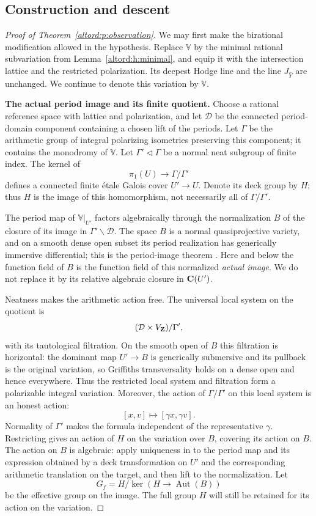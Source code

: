 \subsection{Construction and descent}
\begin{proof}[Proof of Theorem~\ref{altord:p:observation}]
We may first make the birational modification allowed in the hypothesis.
Replace $\mathbb V$ by the minimal rational subvariation from
Lemma~\ref{altord:h:minimal}, and equip it with the intersection lattice and
the restricted polarization.  Its deepest Hodge line and the line
$J_{\widehat Y}$ are unchanged.  We continue to denote this variation
by $\mathbb V$.

\medskip\noindent
\textbf{The actual period image and its finite quotient.}
Choose a rational reference space with lattice and polarization, and
let $\mathcal D$ be the connected period-domain component containing a
chosen lift of the periods. Let $\Gamma$ be the arithmetic group of
integral polarizing isometries preserving this component; it contains
the monodromy of $\mathbb V$. Let $\Gamma'\triangleleft\Gamma$ be a
normal neat subgroup of finite index.  The kernel of
\[
  \pi_1(U)\longrightarrow\Gamma/\Gamma'
\]
defines a connected finite \'etale Galois cover $U'\to U$.  Denote its
deck group by $H$; thus $H$ is the image of this homomorphism, not
necessarily all of $\Gamma/\Gamma'$.

The period map of $\mathbb V|_{U'}$ factors algebraically through the
normalization $B$ of the closure of its image in
$\Gamma'\backslash\mathcal D$.  The space $B$ is a normal
quasiprojective variety, and on a smooth dense open subset its period
realization has generically immersive differential; this is the
period-image theorem \cite[Theorem~1.1]{BakkerBrunebarbeTsimerman}.  Here and below the function
field of $B$ is the function field of this normalized \emph{actual
image}.  We do not replace it by its relative algebraic closure in
$\mathbf C(U')$.

Neatness makes the arithmetic action free.  The universal local system
on the quotient is
\[
  (\mathcal D\times V_{\mathbf Z})/\Gamma',
\]
with its tautological filtration. On the smooth open of $B$ this
filtration is horizontal: the dominant map $U'\to B$ is generically
submersive and its pullback is the original variation, so Griffiths
transversality holds on a dense open and hence everywhere. Thus the
restricted local system and filtration form a polarizable integral
variation. Moreover, the action of
$\Gamma/\Gamma'$ on this local system is an honest action:
\[
  [x,v]\longmapsto[\gamma x,\gamma v].
\]
Normality of $\Gamma'$ makes the formula independent of the
representative $\gamma$.  Restricting gives an action of $H$ on the
variation over $B$, covering its action on $B$. The action on $B$ is
algebraic: apply uniqueness in \cite[Theorem~1.1]{BakkerBrunebarbeTsimerman} to the period map
and its expression obtained by a deck transformation on $U'$ and the
corresponding arithmetic translation on the target, and then lift to
the normalization. Let
\[
  G_f=H/\ker(H\longrightarrow\operatorname{Aut}(B))
\]
be the effective group on the image.  The full group $H$ will still be
retained for its action on the variation.


\end{proof}
